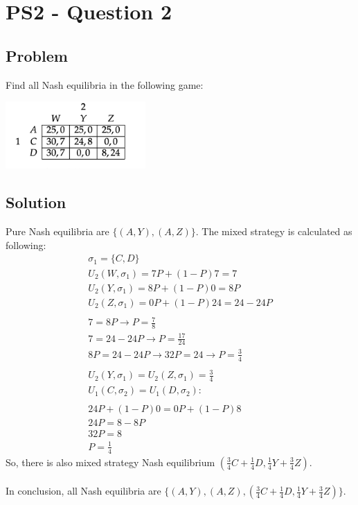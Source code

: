 \documentclass[10pt, a4paper]{article}
\begin{document}
\section*{PS2 - Question 2} 
  \subsection*{Problem}
    Find all Nash equilibria in the following game: 
    \begin{center}
      \includegraphics[width=0.4\textwidth]{PS2-2.png}
    \end{center}
  \subsection*{Solution}
    Pure Nash equilibria are $\{(A, Y), (A, Z)\}$. The mixed strategy is calculated as following:
    \begin{gather*}
      \sigma_1 = \{C,D\} \\
      U_2(W, \sigma_1) = 7P + (1-P)7 = 7 \\
      U_2(Y, \sigma_1) = 8P + (1-P)0 = 8P \\
      U_2(Z, \sigma_1) = 0P + (1-P)24 = 24 - 24P \\
      \\
      7 = 8P \rightarrow P = \frac{7}{8} \\
      7 = 24 - 24P \rightarrow P = \frac{17}{24} \\
      8P = 24 - 24P \rightarrow 32P = 24 \rightarrow P = \frac{3}{4} \\
      \\
      U_2(Y, \sigma_1) = U_2(Z, \sigma_1) = \frac{3}{4}\\
      U_1(C, \sigma_2) = U_1(D, \sigma_2): \\
      \\
      24P + (1-P)0 = 0P + (1-P)8 \\
      24P = 8 - 8P \\
      32P = 8 \\
      P = \frac{1}{4}
    \end{gather*}
    So, there is also mixed strategy Nash equilibrium $(\frac{3}{4}C + \frac{1}{4}D, \frac{1}{4}Y + \frac{3}{4}Z)$. \\
    \\
    In conclusion, all Nash equilibria are $\{(A,Y), (A,Z), (\frac{3}{4}C + \frac{1}{4}D, \frac{1}{4}Y + \frac{3}{4}Z)\}$.
\end{document}
